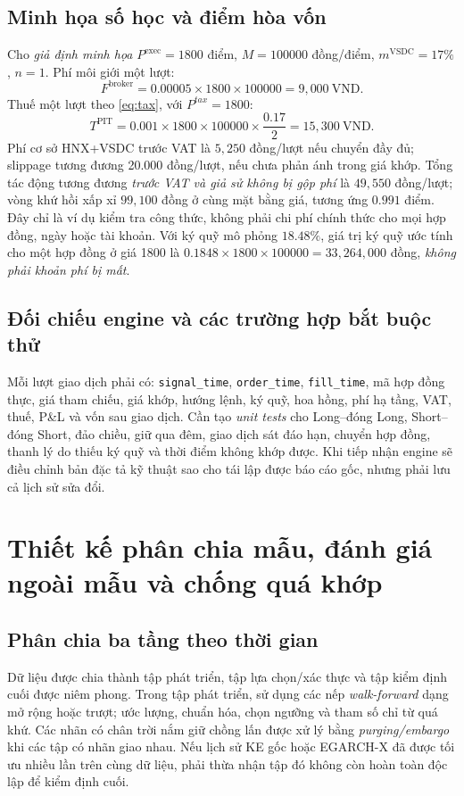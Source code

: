\documentclass[12pt,a4paper,oneside]{article}
\begin{document}
\subsection{Minh họa số học và điểm hòa vốn}
Cho \emph{giả định minh họa} $P^{\mathrm{exec}}=1800$ điểm, $M=100000$ đồng/điểm, $m^{\mathrm{VSDC}}=17\%$, $n=1$. Phí môi giới một lượt:
\begin{equation}
F^{\mathrm{broker}}=0.00005\times1800\times100000=9{,}000\ \mathrm{VND}.
\end{equation}
Thuế một lượt theo \eqref{eq:tax}, với $P^{tax}=1800$:
\begin{equation}
T^{\mathrm{PIT}}=0.001\times1800\times100000\times\frac{0.17}{2}=15{,}300\ \mathrm{VND}.
\end{equation}
Phí cơ sở HNX+VSDC trước VAT là $5{,}250$ đồng/lượt nếu chuyển đầy đủ; slippage tương đương 20.000 đồng/lượt, nếu chưa phản ánh trong giá khớp. Tổng tác động tương đương \emph{trước VAT và giả sử không bị gộp phí} là $49{,}550$ đồng/lượt; vòng khứ hồi xấp xỉ $99{,}100$ đồng ở cùng mặt bằng giá, tương ứng $0.991$ điểm. Đây chỉ là ví dụ kiểm tra công thức, không phải chi phí chính thức cho mọi hợp đồng, ngày hoặc tài khoản. Với ký quỹ mô phỏng $18.48\%$, giá trị ký quỹ ước tính cho một hợp đồng ở giá 1800 là $0.1848\times1800\times100000=33{,}264{,}000$ đồng, \emph{không phải khoản phí bị mất}.

\subsection{Đối chiếu engine và các trường hợp bắt buộc thử}
Mỗi lượt giao dịch phải có: \texttt{signal\_time}, \texttt{order\_time}, \texttt{fill\_time}, mã hợp đồng thực, giá tham chiếu, giá khớp, hướng lệnh, ký quỹ, hoa hồng, phí hạ tầng, VAT, thuế, P\&L và vốn sau giao dịch. Cần tạo \emph{unit tests} cho Long--đóng Long, Short--đóng Short, đảo chiều, giữ qua đêm, giao dịch sát đáo hạn, chuyển hợp đồng, thanh lý do thiếu ký quỹ và thời điểm không khớp được. Khi tiếp nhận engine sẽ điều chỉnh bản đặc tả kỹ thuật sao cho tái lập được báo cáo gốc, nhưng phải lưu cả lịch sử sửa đổi.

\section{Thiết kế phân chia mẫu, đánh giá ngoài mẫu và chống quá khớp}
\subsection{Phân chia ba tầng theo thời gian}
Dữ liệu được chia thành tập phát triển, tập lựa chọn/xác thực và tập kiểm định cuối được niêm phong. Trong tập phát triển, sử dụng các nếp \emph{walk-forward} dạng mở rộng hoặc trượt; ước lượng, chuẩn hóa, chọn ngưỡng và tham số chỉ từ quá khứ. Các nhãn có chân trời nắm giữ chồng lấn được xử lý bằng \emph{purging/embargo} khi các tập có nhãn giao nhau. Nếu lịch sử KE gốc hoặc EGARCH-X đã được tối ưu nhiều lần trên cùng dữ liệu, phải thừa nhận tập đó không còn hoàn toàn độc lập để kiểm định cuối.
\end{document}
